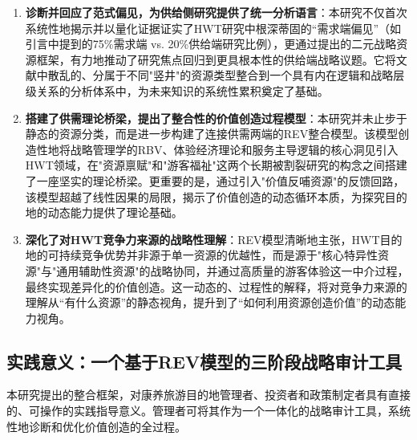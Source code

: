 \documentclass[UTF8, 12pt, a4paper, twoside]{ctexart}
\begin{document}
\begin{enumerate}[label=\arabic*)]
	\item \textbf{诊断并回应了范式偏见，为供给侧研究提供了统一分析语言}：本研究不仅首次系统性地揭示并以量化证据证实了HWT研究中根深蒂固的“需求端偏见”（如引言中提到的75\%需求端 vs. 20\%供给端研究比例），更通过提出的二元战略资源框架，有力地推动了研究焦点回归到更具根本性的供给端战略议题。它将文献中散乱的、分属于不同"竖井"的资源类型整合到一个具有内在逻辑和战略层级关系的分析体系中，为未来知识的系统性累积奠定了基础。
	\item \textbf{搭建了供需理论桥梁，提出了整合性的价值创造过程模型}：本研究并未止步于静态的资源分类，而是进一步构建了连接供需两端的REV整合模型。该模型创造性地将战略管理学的RBV、体验经济理论和服务主导逻辑的核心洞见引入HWT领域，在"资源禀赋"和"游客福祉"这两个长期被割裂研究的构念之间搭建了一座坚实的理论桥梁。更重要的是，通过引入"价值反哺资源"的反馈回路，该模型超越了线性因果的局限，揭示了价值创造的动态循环本质，为探究目的地的动态能力提供了理论基础。
	\item \textbf{深化了对HWT竞争力来源的战略性理解}：REV模型清晰地主张，HWT目的地的可持续竞争优势并非源于单一资源的优越性，而是源于"核心特异性资源"与"通用辅助性资源"的战略协同，并通过高质量的游客体验这一中介过程，最终实现差异化的价值创造。这一动态的、过程性的解释，将对竞争力来源的理解从“有什么资源”的静态视角，提升到了“如何利用资源创造价值”的动态能力视角。
\end{enumerate}

\subsection{实践意义：一个基于REV模型的三阶段战略审计工具}
本研究提出的整合框架，对康养旅游目的地管理者、投资者和政策制定者具有直接的、可操作的实践指导意义。管理者可将其作为一个一体化的战略审计工具，系统性地诊断和优化价值创造的全过程。
\end{document}
